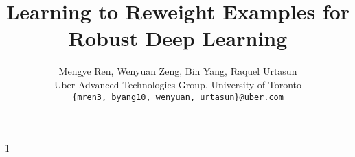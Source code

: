 \documentclass{article}
\begin{document}
\title{Learning to Reweight Examples for Robust Deep Learning}
\author{
  Mengye Ren, Wenyuan Zeng, Bin Yang, Raquel Urtasun\\
  Uber Advanced Technologies Group, University of Toronto\\
  \small{\texttt{\{mren3, byang10, wenyuan, urtasun\}@uber.com}}
}
\maketitle
\def\arxiv{1}








\let\oldbibliography\thebibliography
\renewcommand{\thebibliography}[1]{\oldbibliography{#1}
\setlength{\itemsep}{7pt}} %



% 

\if\arxiv1
\newpage

\fi
\end{document}
